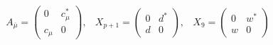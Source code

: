 \begin{equation}
\begin{array}{ccc}
A_{\bar{\mu}}= \left(
\begin{array}{cc}
0 & c_{\mu}^{*} \\
c_{\mu} & 0
\end{array}
\right), &
X_{p+1}= \left(
\begin{array}{cc}
0 & d^{*} \\
d & 0 
\end{array}
\right) 
, &
X_{9}= \left(
\begin{array}{cc}
0 & w^{*} \\
w & 0 
\end{array}
\right) 
\end{array}\label{ansatz2}
\end{equation}

